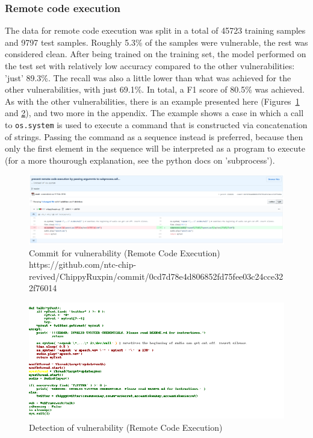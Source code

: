\documentclass[
a4paper,
pagesize,
pdftex,
12pt,
twoside, %
BCOR=5mm, %
ngerman,
fleqn,
final,
]{scrartcl}
\begin{document}
	\subsubsection{Remote code execution}
	The data for remote code execution was split in a total of 45723 training samples and 9797 test samples. Roughly 5.3\% of the samples were vulnerable, the rest was considered clean. After being trained on the training set, the model performed on the test set with relatively low accuracy compared to the other vulnerabilities: 'just' 89.3\%. The recall was also a little lower than what was achieved for the other vulnerabilities, with just 69.1\%. In total, a F1 score of 80.5\% was achieved. As with the other vulnerabilities, there is an example presented here (Figures~\ref{fig:remote_code_executionB} and \ref{fig:remote_code_executionBr}), and two more in the appendix. The example shows a case in which a call to \texttt{os.system} is used to execute a command that is constructed via concatenation of strings. Passing the command as a sequence instead is preferred, because then only the first element in the sequence will be interpreted as a program to execute (for a more thourough explanation, see the python docs on 'subprocess').

	\begin{figure}[H]
		\centering
		\includegraphics[width=\linewidth]{Images/remote_code_executionB}
		\caption{Commit for vulnerability (Remote Code Execution) \newline \scriptsize{https://github.com/ntc-chip-revived/ChippyRuxpin/commit/0cd7d78e4d806852fd75fee03c24cce322f76014}}
		\label{fig:remote_code_executionB}
	\end{figure}
	\begin{figure}[H]
		\centering
		\includegraphics[width=\linewidth]{Images/remote_code_executionBr}
		\caption{Detection of vulnerability (Remote Code Execution)}
		\label{fig:remote_code_executionBr}
	\end{figure}
	
\end{document}
